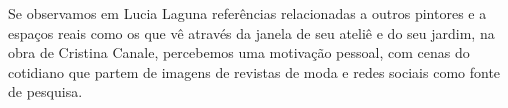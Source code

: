 Se observamos em Lucia Laguna referências relacionadas a outros
pintores e a espaços reais como os que vê através da janela de seu
ateliê e do seu jardim, na obra de Cristina Canale, percebemos uma
motivação pessoal, com cenas do cotidiano que partem de imagens de
revistas de moda e redes sociais como fonte de pesquisa.
